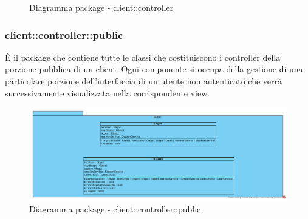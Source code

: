 \begin{center}
\begin{figure}[H]
		\caption{Diagramma package - client::controller}
	\end{figure}
\end{center}\subsubsection{client::controller::public}
È il package che contiene tutte le classi che costituiscono i controller della porzione pubblica di un client. Ogni componente si occupa della gestione di una particolare porzione dell'interfaccia di un utente non autenticato che verrà successivamente visualizzata nella corrispondente view.\begin{center}
	\begin{figure}[H]
		\centering \includegraphics[scale=4, max width=\textwidth, max height=\myheight]{../img/diagrammiClassi/client/controller/public.png}
		\caption{Diagramma package - client::controller::public}
	\end{figure}
\end{center}\hypertarget{client::controller::public::LogIn}{}
